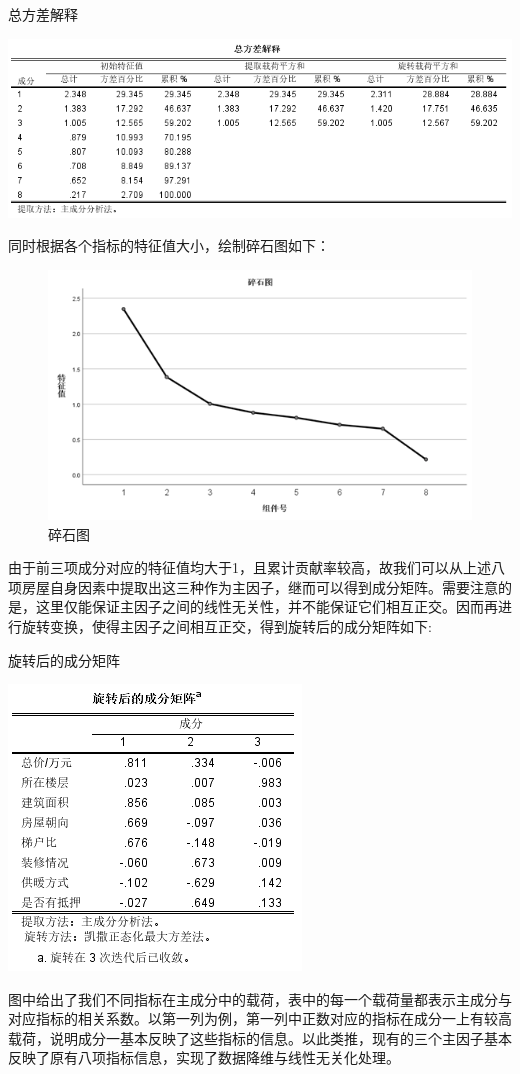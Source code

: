 \documentclass[withoutpreface,bwprint]{cumcmthesis} %
\begin{document}
\begin{table}[H]
    \centering
    \caption{总方差解释}
    \includegraphics[scale=0.8]{总方差解释.png}
    \label{fig:总方差解释}
\end{table}
同时根据各个指标的特征值大小，绘制碎石图如下：
\begin{figure}[H]
    \centering
    \includegraphics[scale=0.7]{碎石图.png}
    \caption{碎石图}
    \label{fig:碎石图}
\end{figure}
由于前三项成分对应的特征值均大于1，且累计贡献率较高，故我们可以从上述八项房屋自身因素中提取出这三种作为主因子，继而可以得到成分矩阵。需要注意的是，这里仅能保证主因子之间的线性无关性，并不能保证它们相互正交。因而再进行旋转变换，使得主因子之间相互正交，得到旋转后的成分矩阵如下:

\begin{table}[H]
    \centering
    \caption{旋转后的成分矩阵}
    \includegraphics[scale=1.1]{旋转后的成分矩阵.png}
    \label{fig:旋转后的成分矩阵}
\end{table}
图中给出了我们不同指标在主成分中的载荷，表中的每一个载荷量都表示主成分与对应指标的相关系数。以第一列为例，第一列中正数对应的指标在成分一上有较高载荷，说明成分一基本反映了这些指标的信息。以此类推，现有的三个主因子基本反映了原有八项指标信息，实现了数据降维与线性无关化处理。
\end{document}
